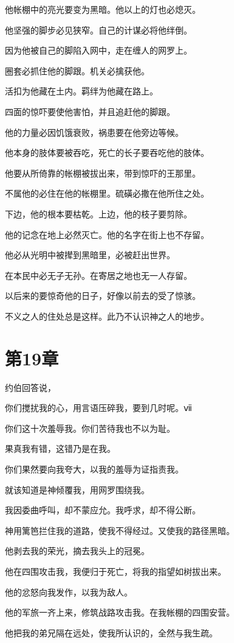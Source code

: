 \documentclass[12pt,oneside]{book}
\begin{document}
他帐棚中的亮光要变为黑暗。他以上的灯也必熄灭。

他坚强的脚步必见狭窄。自己的计谋必将他绊倒。

因为他被自己的脚陷入网中，走在缠人的网罗上。

圈套必抓住他的脚跟。机关必擒获他。

活扣为他藏在土内。羁绊为他藏在路上。

四面的惊吓要使他害怕，并且追赶他的脚跟。

他的力量必因饥饿衰败，祸患要在他旁边等候。

他本身的肢体要被吞吃，死亡的长子要吞吃他的肢体。

他要从所倚靠的帐棚被拔出来，带到惊吓的王那里。

不属他的必住在他的帐棚里。硫磺必撒在他所住之处。

下边，他的根本要枯乾。上边，他的枝子要剪除。

他的记念在地上必然灭亡。他的名字在街上也不存留。

他必从光明中被撵到黑暗里，必被赶出世界。

在本民中必无子无孙。在寄居之地也无一人存留。

以后来的要惊奇他的日子，好像以前去的受了惊骇。

不义之人的住处总是这样。此乃不认识神之人的地步。


\chapter{第19章}
约伯回答说，

你们搅扰我的心，用言语压碎我，要到几时呢。ⅶ

你们这十次羞辱我。你们苦待我也不以为耻。

果真我有错，这错乃是在我。

你们果然要向我夸大，以我的羞辱为证指责我。

就该知道是神倾覆我，用网罗围绕我。

我因委曲呼叫，却不蒙应允。我呼求，却不得公断。

神用篱笆拦住我的道路，使我不得经过。又使我的路径黑暗。

他剥去我的荣光，摘去我头上的冠冕。

他在四围攻击我，我便归于死亡，将我的指望如树拔出来。

他的忿怒向我发作，以我为敌人。

他的军旅一齐上来，修筑战路攻击我。在我帐棚的四围安营。

他把我的弟兄隔在远处，使我所认识的，全然与我生疏。
\end{document}
